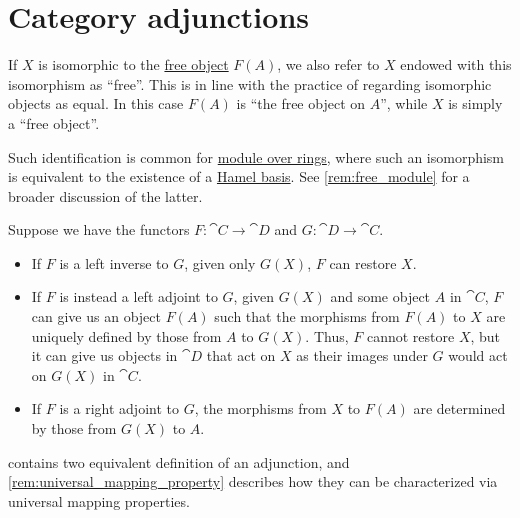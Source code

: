 \section{Category adjunctions}\label{sec:category_adjunctions}

\begin{remark}\label{rem:free_construction_univalence}
  If \( X \) is isomorphic to the \hyperref[con:free_construction]{free object} \( F(A) \), we also refer to \( X \) endowed with this isomorphism as \enquote{free}. This is in line with the practice of regarding isomorphic objects as equal. In this case \( F(A) \) is \enquote{the free object on \( A \)}, while \( X \) is simply a \enquote{free object}.

  Such identification is common for \hyperref[def:module]{module over rings}, where such an isomorphism is equivalent to the existence of a \hyperref[def:hamel_basis]{Hamel basis}. See \cref{rem:free_module} for a broader discussion of the latter.
\end{remark}

\begin{remark}\label{rem:adjoint_functors}
  Suppose we have the functors \( F: \cat{C} \to \cat{D} \) and \( G: \cat{D} \to \cat{C} \).

  \begin{itemize}
    \item If \( F \) is a left inverse to \( G \), given only \( G(X) \), \( F \) can restore \( X \).

    \item If \( F \) is instead a left adjoint to \( G \), given \( G(X) \) and some object \( A \) in \( \cat{C} \), \( F \) can give us an object \( F(A) \) such that the morphisms from \( F(A) \) to \( X \) are uniquely defined by those from \( A \) to \( G(X) \). Thus, \( F \) cannot restore \( X \), but it can give us objects in \( \cat{D} \) that act on \( X \) as their images under \( G \) would act on \( G(X) \) in \( \cat{C} \).

    \item If \( F \) is a right adjoint to \( G \), the morphisms from \( X \) to \( F(A) \) are determined by those from \( G(X) \) to \( A \).
  \end{itemize}

   contains two equivalent definition of an adjunction, and \cref{rem:universal_mapping_property} describes how they can be characterized via universal mapping properties.
\end{remark}

